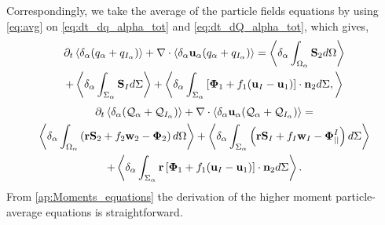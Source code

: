 Correspondingly, we take the average of the particle fields equations by using \ref{eq:avg} on \ref{eq:dt_dq_alpha_tot} and \ref{eq:dt_dQ_alpha_tot}, which gives, 
\begin{multline}
    \partial_t \left<\delta_\alpha (q_\alpha+q_{I_\alpha})\right>
    + \mathbf{\nabla} \cdot \left<\delta_\alpha\textbf{u}_\alpha(q_\alpha+q_{I_\alpha})\right>
    = \left<\delta_\alpha\int_{\Omega_\alpha} \textbf{S}_2 d\Omega\right>\\
    + \left<\delta_\alpha\int_{\Sigma_\alpha} \textbf{S}_I d\Sigma\right>
    + \left<\delta_\alpha\int_{\Sigma_\alpha} \left[\mathbf{\Phi}_1 + f_1 (\textbf{u}_I-\textbf{u}_1) \right] \cdot \textbf{n}_2 d\Sigma,\right>
    \label{eq:avg_dt_dq_alpha_tot}
\end{multline}
\begin{multline}
    \partial_t \left<\delta_\alpha (\mathcal{Q}_\alpha+\mathcal{Q}_{I_\alpha})\right>
    + \mathbf{\nabla} \cdot \left<\delta_\alpha\textbf{u}_\alpha(\mathcal{Q}_\alpha+\mathcal{Q}_{I_\alpha})\right>
    =\\ \left<\delta_\alpha\int_{\Omega_\alpha} \left(
        \textbf{r} \textbf{S}_2         
        + f_2  \textbf{w}_2 
        - \mathbf{\Phi}_2
    \right) d\Omega\right>
    + \left<\delta_\alpha\int_{\Sigma_\alpha} \left(
        \textbf{r}\textbf{S}_I
        + f_I \textbf{w}_I
        - \mathbf{\Phi}_{||}^I
    \right) d\Sigma\right>\\
    + \left<\delta_\alpha\int_{\Sigma_\alpha} \textbf{r} \left[
        \mathbf{\Phi}_1
        + f_1 (\textbf{u}_I-\textbf{u}_1)
    \right]\cdot \textbf{n}_2  d\Sigma\right>.
    \label{eq:avg_dt_dQ_alpha_tot}
\end{multline}
From \ref{ap:Moments_equations} the derivation of the higher moment particle-average equations is straightforward. 